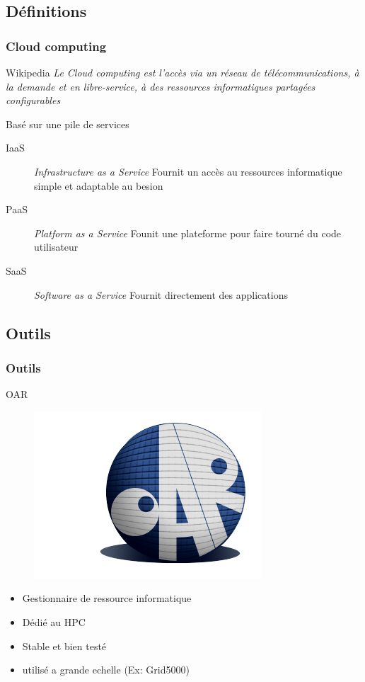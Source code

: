 \documentclass{beamer}
\begin{document}
		\subsection{Définitions}
			\begin{frame}
			  \frametitle{Cloud computing}
			    \begin{block}{Wikipedia}
			      \textit{Le Cloud computing est l'accès via un réseau de télécommunications, à la demande et en libre-service, à des ressources informatiques partagées configurables}
			    \end{block}

			    Basé sur une pile de services
			    \begin{description}
			      \item[IaaS]\textit{ Infrastructure as a Service} 
			      Fournit un accès au ressources informatique simple et adaptable au besion
			      \item[PaaS]\textit{Platform as a Service}
			      Founit une plateforme pour faire tourné du code utilisateur
			      \item[SaaS]\textit{Software as a Service}
			      Fournit directement des applications
			    \end{description}
			\end{frame}
			
		\subsection{Outils}
			\begin{frame}
				\frametitle{Outils}
				OAR
				\begin{figure}
			    \includegraphics[scale=0.3]{img/logo_oar.png}
 			  \end{figure}
 			  \begin{itemize}
   			  \item Gestionnaire de ressource informatique
   			  \item Dédié au HPC
   			  \item Stable et bien testé
   			  \item utilisé a grande echelle (Ex: Grid5000)
 			  \end{itemize}
			\end{frame}
	
\end{document}
